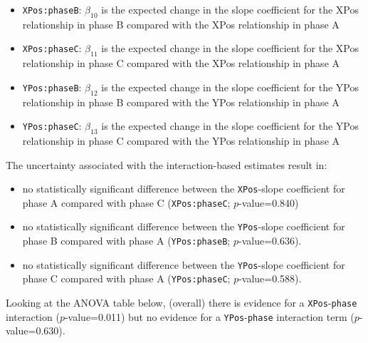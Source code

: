 \documentclass[
  oneside]{krantz}
\providecommand{\tightlist}{%
  \setlength{\itemsep}{0pt}\setlength{\parskip}{0pt}}
\begin{document}
\begin{itemize}
\tightlist
\item
  \texttt{XPos:phaseB}: \(\beta_{10}\) is the expected change in the slope coefficient for the XPos relationship in phase B compared with the XPos relationship in phase A
\item
  \texttt{XPos:phaseC}: \(\beta_{11}\) is the expected change in the slope coefficient for the XPos relationship in phase C compared with the XPos relationship in phase A
\item
  \texttt{YPos:phaseB}: \(\beta_{12}\) is the expected change in the slope coefficient for the YPos relationship in phase B compared with the YPos relationship in phase A
\item
  \texttt{YPos:phaseC}: \(\beta_{13}\) is the expected change in the slope coefficient for the YPos relationship in phase C compared with the YPos relationship in phase A
\end{itemize}

The uncertainty associated with the interaction-based estimates result in:

\begin{itemize}
\tightlist
\item
  no statistically significant difference between the \texttt{XPos}-slope coefficient for phase A compared with phase C (\texttt{XPos:phaseC}; \(p\)-value=0.840)\\
\item
  no statistically significant difference between the \texttt{YPos}-slope coefficient for phase B compared with phase A (\texttt{YPos:phaseB}; \(p\)-value=0.636).
\item
  no statistically significant difference between the \texttt{YPos}-slope coefficient for phase C compared with phase A (\texttt{YPos:phaseC}; \(p\)-value=0.588).
\end{itemize}

Looking at the ANOVA table below, (overall) there is evidence for a \texttt{XPos}-\texttt{phase} interaction (\(p\)-value=0.011) but no evidence for a \texttt{YPos}-\texttt{phase} interaction term (\(p\)-value=0.630).
\end{document}
